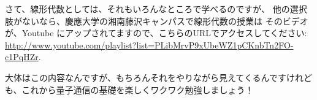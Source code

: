 さて、線形代数としては、それもいろんなところで学べるのですが、
他の選択肢がないなら、慶應大学の湘南藤沢キャンパスで線形代数の授業は
そのビデオが、Youtube にアップされてますので、こちらのURLでアクセスしてください:
\url{http://www.youtube.com/playlist?list=PLibMrvP9xUbeWZ1pCKnbTn2FO-c1PqHZr}.

大体はこの内容なんですが、もちろんそれをやりながら見えてくるんですけれども、これから量子通信の基礎を楽しくワクワク勉強しましょう！
